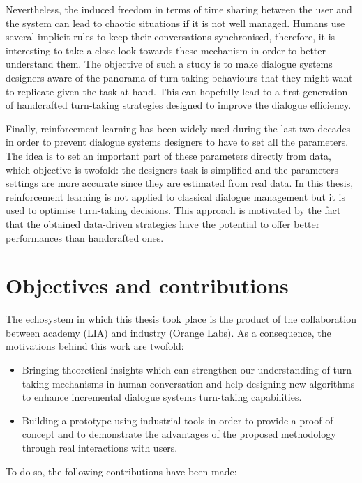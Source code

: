 				Nevertheless, the induced freedom in terms of time sharing between the user and the system can lead to chaotic situations if it is not well managed. Humans use several implicit rules to keep their conversations synchronised, therefore, it is interesting to take a close look towards these mechanism in order to better understand them. The objective of such a study is to make dialogue systems designers aware of the panorama of turn-taking behaviours that they might want to replicate given the task at hand. This can hopefully lead to a first generation of handcrafted turn-taking strategies designed to improve the dialogue efficiency.
				
				Finally, reinforcement learning has been widely used during the last two decades in order to prevent dialogue systems designers to have to set all the parameters. The idea is to set an important part of these parameters directly from data, which objective is twofold: the designers task is simplified and the parameters settings are more accurate since they are estimated from real data. In this thesis, reinforcement learning is not applied to classical dialogue management but it is used to optimise turn-taking decisions. This approach is motivated by the fact that the obtained data-driven strategies have the potential to offer better performances than handcrafted ones.
				
\section*{Objectives and contributions}

				The echosystem in which this thesis took place is the product of the collaboration between academy (LIA) and industry (Orange Labs). As a consequence, the motivations behind this work are twofold:
				
				\begin{itemize}
					\item Bringing theoretical insights which can strengthen our understanding of turn-taking mechanisms in human conversation and help designing new algorithms to enhance incremental dialogue systems turn-taking capabilities.
					\item Building a prototype using industrial tools in order to provide a proof of concept and to demonstrate the advantages of the proposed methodology through real interactions with users.
				\end{itemize}
				
				To do so, the following contributions have been made:
				
